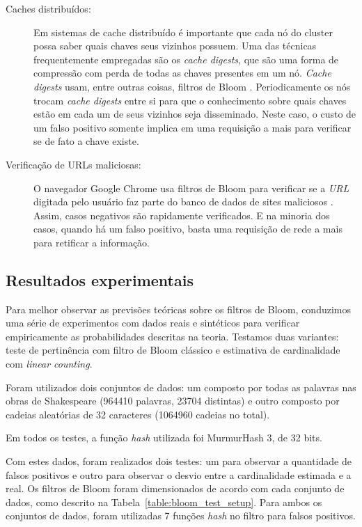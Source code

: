 \begin{description}
\item[Caches distribuídos:]

Em sistemas de cache distribuído é importante que cada nó do cluster possa saber quais chaves seus vizinhos possuem. Uma das técnicas frequentemente empregadas são os \emph{cache digests}, que são uma forma de compressão com perda de todas as chaves presentes em um nó. \emph{Cache digests} usam, entre outras coisas, filtros de Bloom \cite{rousskov1998cache}. Periodicamente os nós trocam \emph{cache digests} entre si para que o conhecimento sobre quais chaves estão em cada um de seus vizinhos seja disseminado. Neste caso, o custo de um falso positivo somente implica em uma requisição a mais para verificar se de fato a chave existe.

\item[Verificação de URLs maliciosas:]

O navegador Google Chrome usa filtros de Bloom para verificar se a \emph{URL} digitada pelo usuário faz parte do banco de dados de sites maliciosos \cite{honoroff2006bloom}. Assim, casos negativos são rapidamente verificados. E na minoria dos casos, quando há um falso positivo, basta uma requisição de rede a mais para retificar a informação.

\end{description}

\subsection{Resultados experimentais}\label{sec:bloom:experiments}

Para melhor observar as previsões teóricas sobre os filtros de Bloom, conduzimos uma série de experimentos com dados reais e sintéticos para verificar empiricamente as probabilidades descritas na teoria. Testamos duas variantes: teste de pertinência com filtro de Bloom clássico e estimativa de cardinalidade com \emph{linear counting}.

Foram utilizados dois conjuntos de dados: um composto por todas as palavras nas obras de Shakespeare (964410 palavras, 23704 distintas) e outro composto por cadeias aleatórias de 32 caracteres (1064960 cadeias no total).

Em todos os testes, a função \emph{hash} utilizada foi MurmurHash 3, de 32 bits.

Com estes dados, foram realizados dois testes: um para observar a quantidade de falsos positivos e outro para observar o desvio entre a cardinalidade estimada e a real. Os filtros de Bloom foram dimensionados de acordo com cada conjunto de dados, como descrito na Tabela~\ref{table:bloom_test_setup}. Para ambos os conjuntos de dados, foram utilizadas 7 funções \emph{hash} no filtro para falsos positivos.

